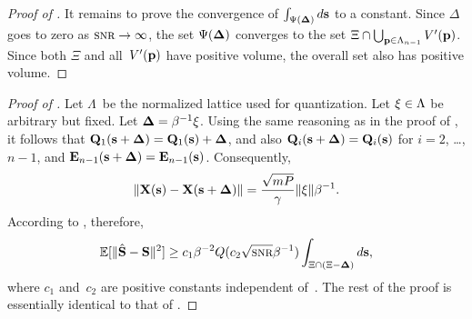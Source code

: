 \begin{subappendices}
\begin{proof}[Proof of ]
    It remains to prove the convergence of $\int_{\Psi(\mathbf{\Delta})} d\mathbf{s}$ to a constant.
    Since $\Delta$ goes to zero as $\snr \goesto \infty$, the set $\Psi(\mathbf{\Delta})$
    converges to the set $\Xi \cap \bigcup_{\mathbf{p} \in {\Lambda_{n-1}}} V'(\mathbf{p})$. Since both
    $\Xi$ and all~$V'(\mathbf{p})$ have positive volume, the overall set also has
    positive volume.
  \end{proof}


  \begin{proof}[Proof of ]
    Let $\Lambda$~be the normalized lattice used for quantization. Let $\mathbf{\xi} \in
    \Lambda$ be arbitrary but fixed. Let $\mathbf{\Delta} = \beta^{-1} \mathbf{\xi}$. Using the same
    reasoning as in the proof of , it follows that $\mathbf{Q}_1(\mathbf{s}
    + \mathbf{\Delta}) = \mathbf{Q}_1(\mathbf{s}) + \mathbf{\Delta}$, and also $\mathbf{Q}_i(\mathbf{s} + \mathbf{\Delta}) = \mathbf{Q}_i(\mathbf{s})$ for $i = 2$,
    \ldots, $n-1$, and $\mathbf{E}_{n-1}(\mathbf{s}+\mathbf{\Delta}) = \mathbf{E}_{n-1}(\mathbf{s})$. Consequently,
    \begin{equation*}
      \| \mathbf{X}(\mathbf{s}) - \mathbf{X}(\mathbf{s} +\mathbf{\Delta}) \| = \frac{\sqrt{mP}}{\gamma}\|\mathbf{\xi}\| \beta^{-1}.
    \end{equation*}
    According to , therefore,
    \begin{equation*}
      \msev \ge c_1 \beta^{-2} Q(c_2 \sqrt{\snr} \beta^{-1}) \int_{\Xi \cap (\Xi
      - \Dv)} d\s,
    \end{equation*}
    where $c_1$ and~$c_2$ are positive constants independent of~\snr.  The rest
    of the proof is essentially identical to that of
    . 
  \end{proof}

\end{subappendices}
